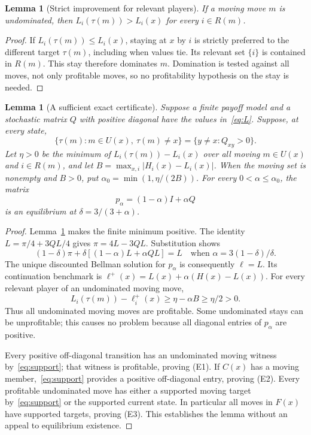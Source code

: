 \documentclass[11pt,a4paper]{article}
\newtheorem{lemma}[theorem]{Lemma}
\theoremstyle{definition}\newtheorem{definition}[theorem]{Definition}
\theoremstyle{remark}\newtheorem{remark}[theorem]{Remark}
\newcommand{\1}{\mathbf 1}
\begin{document}
\begin{lemma}[Strict improvement for relevant players]\label{lem:strict}
If a moving move $m$ is undominated, then
$L_i(\tau(m))>L_i(x)$ for every $i\in R(m)$.
\end{lemma}
\begin{proof}
If $L_i(\tau(m))\le L_i(x)$, staying at $x$ by $i$ is strictly preferred to the different target $\tau(m)$, including when values tie. Its relevant set $\{i\}$ is contained in $R(m)$. This stay therefore dominates $m$. Domination is tested against all moves, not only profitable moves, so no profitability hypothesis on the stay is needed.
\end{proof}

\begin{lemma}[A sufficient exact certificate]\label{lem:certificate}
Suppose a finite payoff model and a stochastic matrix $Q$ with positive diagonal have the values in~\eqref{eq:L}. Suppose, at every state,
\begin{equation}\label{eq:support}
 \{\tau(m):m\in U(x),\ \tau(m)\ne x\}
 =\{y\ne x:Q_{xy}>0\}.
\end{equation}
Let $\eta>0$ be the minimum of $L_i(\tau(m))-L_i(x)$ over all moving $m\in U(x)$ and $i\in R(m)$, and let
$B=\max_{x,i}|H_i(x)-L_i(x)|$. When the moving set is nonempty and $B>0$, put $\alpha_0=\min(1,\eta/(2B))$. For every $0<\alpha\le\alpha_0$, the matrix
\[
 p_\alpha=(1-\alpha)I+\alpha Q
\]
is an equilibrium at $\delta=3/(3+\alpha)$.
\end{lemma}
\begin{proof}
Lemma~\ref{lem:strict} makes the finite minimum positive. The identity $L=\pi/4+3QL/4$ gives $\pi=4L-3QL$. Substitution shows
\[
 (1-\delta)\pi+\delta[(1-\alpha)L+\alpha QL]=L
 \quad\text{when }\alpha=3(1-\delta)/\delta.
\]
The unique discounted Bellman solution for $p_\alpha$ is consequently $\ell=L$. Its continuation benchmark is
$\ell^+(x)=L(x)+\alpha(H(x)-L(x))$. For every relevant player of an undominated moving move,
\[
 L_i(\tau(m))-\ell_i^+(x)
 \ge\eta-\alpha B\ge\eta/2>0.
\]
Thus all undominated moving moves are profitable. Some undominated stays can be unprofitable; this causes no problem because all diagonal entries of $p_\alpha$ are positive.

Every positive off-diagonal transition has an undominated moving witness by~\eqref{eq:support}; that witness is profitable, proving (E1). If $C(x)$ has a moving member,~\eqref{eq:support} provides a positive off-diagonal entry, proving (E2). Every profitable undominated move has either a supported moving target by~\eqref{eq:support} or the supported current state. In particular all moves in $F(x)$ have supported targets, proving (E3). This establishes the lemma without an appeal to equilibrium existence.
\end{proof}
\end{document}
